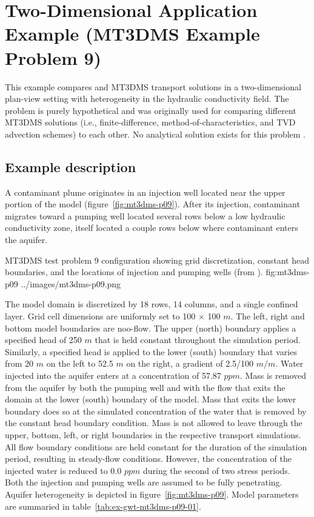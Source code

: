 \section{Two-Dimensional Application Example (MT3DMS Example Problem 9)}

This example compares \mf and MT3DMS transport solutions in a two-dimensional plan-view setting with heterogeneity in the hydraulic conductivity field. The problem is purely hypothetical and was originally used for comparing different MT3DMS solutions (i.e., finite-difference, method-of-characteristics, and TVD advection schemes) to each other.  No analytical solution exists for this problem \citep{zheng1999mt3dms}.

\subsection{Example description}

A contaminant plume originates in an injection well located near the upper portion of the model (figure~\ref{fig:mt3dms-p09}).  After its injection, contaminant migrates toward a pumping well located several rows below a low hydraulic conductivity zone, itself located a couple rows below where contaminant enters the aquifer. 

\begin{StandardFigure}
	{MT3DMS test problem 9 configuration showing grid discretization, constant head boundaries, and the locations of injection and pumping wells (from \cite{zheng1999mt3dms}).} 
	{fig:mt3dms-p09}
	{../images/mt3dms-p09.png}
\end{StandardFigure}

The model domain is discretized by 18 rows, 14 columns, and a single confined layer.  Grid cell dimensions are uniformly set to 100 $\times$ 100 $m$.  The left, right and bottom model boundaries are noo-flow.  The upper (north) boundary applies a specified head of 250 $m$ that is held constant throughout the simulation period.  Similarly, a specified head is applied to the lower (south) boundary that varies from 20 $m$ on the left to 52.5 $m$ on the right, a gradient of 2.5/100 $m/m$.  Water injected into the aquifer enters at a concentration of 57.87 $ppm$.  Mass is removed from the aquifer by both the pumping well and with the flow that exits the domain at the lower (south) boundary of the model.  Mass that exits the lower boundary does so at the simulated concentration of the water that is removed by the constant head boundary condition.  Mass is not allowed to leave through the upper, bottom, left, or right boundaries in the respective transport simulations.  All flow boundary conditions are held constant for the duration of the simulation period, resulting in steady-flow conditions.  However, the concentration of the injected water is reduced to 0.0 $ppm$ during the second of two stress periods.  Both the injection and pumping wells are assumed to be fully penetrating.  Aquifer heterogeneity is depicted in figure~\ref{fig:mt3dms-p09}.  Model parameters are summaried in table~\ref{tab:ex-gwt-mt3dms-p09-01}.

